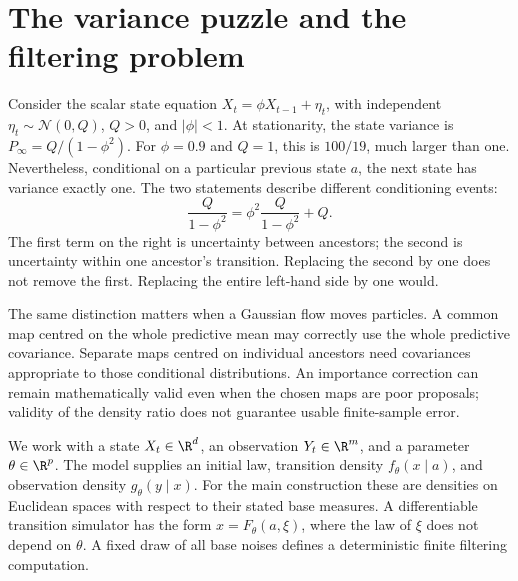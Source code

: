 \newcommand{\bfCovOne}{\mathbf 1}
\newcommand{\bfCovNormal}{\mathcal N}
\newcommand{\bfCovDiff}{\mathrm d}
\newcommand{\bfCovSPD}{\mathbb S_{++}}
\newcommand{\bfCovLSE}{\operatorname{LSE}}
\newcommand{\bfCovSoftmax}{\operatorname{softmax}}

\section{The variance puzzle and the filtering problem}

Consider the scalar state equation
\(X_t=\phi X_{t-1}+\eta_t\), with independent
\(\eta_t\sim\bfCovNormal(0,Q)\), \(Q>0\), and \(|\phi|<1\).
At stationarity, the state variance is \(P_\infty=Q/(1-\phi^2)\).
For \(\phi=0.9\) and \(Q=1\), this is \(100/19\), much larger than one.
Nevertheless, conditional on a particular previous state \(a\), the next
state has variance exactly one. The two statements describe different
conditioning events:
\begin{equation}
\label{eq:bf-covariance-proposal-ar1-total}
 \frac{Q}{1-\phi^2}
 =\phi^2\frac{Q}{1-\phi^2}+Q.
\end{equation}
The first term on the right is uncertainty between ancestors; the second is
uncertainty within one ancestor's transition. Replacing the second by one
does not remove the first. Replacing the entire left-hand side by one would.

The same distinction matters when a Gaussian flow moves particles. A common
map centred on the whole predictive mean may correctly use the whole
predictive covariance. Separate maps centred on individual ancestors need
covariances appropriate to those conditional distributions. An importance
correction can remain mathematically valid even when the chosen maps are
poor proposals; validity of the density ratio does not guarantee usable
finite-sample error.

We work with a state \(X_t\in\R^d\), an observation \(Y_t\in\R^m\), and a parameter
\(\theta\in\R^p\). The model supplies an initial law, transition density
\(f_\theta(x\mid a)\), and observation density \(g_\theta(y\mid x)\).
For the main construction these are densities on Euclidean spaces with
respect to their stated base measures. A differentiable transition simulator
has the form \(x=F_\theta(a,\xi)\), where the law of \(\xi\) does not depend
on \(\theta\). A fixed draw of all base noises defines a deterministic
finite filtering computation.

